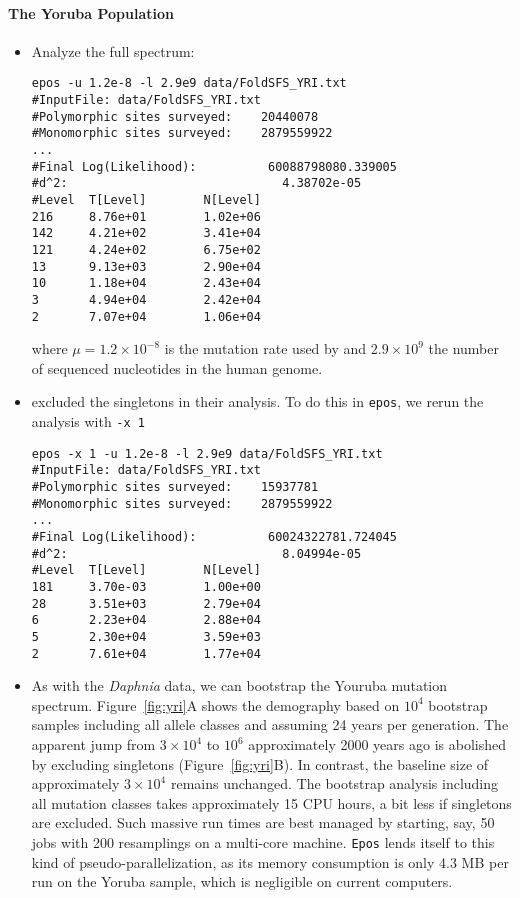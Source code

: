\documentclass[a4paper, english]{article}
\newcommand{\ty}{\texttt}
\begin{document}
\paragraph{The Yoruba Population}
\begin{itemize}
\item Analyze the full spectrum:
\begin{verbatim}
epos -u 1.2e-8 -l 2.9e9 data/FoldSFS_YRI.txt 
#InputFile:	data/FoldSFS_YRI.txt
#Polymorphic sites surveyed:	20440078
#Monomorphic sites surveyed:	2879559922
...
#Final Log(Likelihood):          60088798080.339005
#d^2:                              4.38702e-05
#Level  T[Level]        N[Level]
216     8.76e+01        1.02e+06
142     4.21e+02        3.41e+04
121     4.24e+02        6.75e+02
13      9.13e+03        2.90e+04
10      1.18e+04        2.43e+04
3       4.94e+04        2.42e+04
2       7.07e+04        1.06e+04
\end{verbatim}
where $\mu=1.2\times 10^{-8}$ is the mutation rate used by
\cite{lap17:acc} and $2.9\times 10^9$ the number of sequenced
nucleotides in the human genome.
\item \cite{lap17:acc} excluded
the singletons in their analysis. To do this in \ty{epos}, we rerun the analysis with
\ty{-x 1}
\begin{verbatim}
epos -x 1 -u 1.2e-8 -l 2.9e9 data/FoldSFS_YRI.txt 
#InputFile:	data/FoldSFS_YRI.txt
#Polymorphic sites surveyed:	15937781
#Monomorphic sites surveyed:	2879559922
...
#Final Log(Likelihood):          60024322781.724045
#d^2:                              8.04994e-05
#Level  T[Level]        N[Level]
181     3.70e-03        1.00e+00
28      3.51e+03        2.79e+04
6       2.23e+04        2.88e+04
5       2.30e+04        3.59e+03
2       7.61e+04        1.77e+04
\end{verbatim}
\item As with the \textit{Daphnia} data, we can bootstrap the Youruba
  mutation spectrum. Figure~\ref{fig:yri}A shows the demography based on $10^4$
  bootstrap samples including all allele classes and assuming 24 years
  per generation. The apparent jump from $3\times 10^4$ to $10^6$
  approximately 2000 years ago is abolished by
  excluding singletons (Figure~\ref{fig:yri}B). In contrast, the
  baseline size of approximately $3\times 10^4$ remains unchanged. The bootstrap analysis
  including all mutation classes takes approximately 15 CPU hours, a
  bit less if singletons are excluded. Such massive run times are
  best managed by starting, say, 50 jobs with 200 resamplings on a
  multi-core machine. \ty{Epos} lends itself to this kind of
  pseudo-parallelization, as its memory consumption is only 4.3 MB per
  run on the Yoruba sample, which is negligible on current computers.
\end{itemize}
\end{document}
